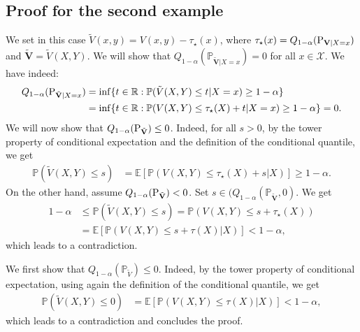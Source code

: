 \subsection{Proof for the second example}
\label{suppl:examplesB}
  We set in this case $\tilde{V}(x,y)= V(x,y) - \tau_\star(x)$, where $\tau_\star(x)= Q_{1-\alpha}(\textup{P}_{\mathbf{V}|X=x})$ and $\tilde{\mathbf{V}}=\tilde{V}(X,Y)$. 
  We will show that $Q_{1-\alpha}(\mathbb{P}_{\tilde{\mathbf{V}}|X=x}) = 0$ for all $x \in \mathcal{X}$. We have indeed:
  \begin{align}
    Q_{1-\alpha}(\textup{P}_{\tilde{\mathbf{V}}|X=x}) &= \inf\{t \in \mathbb{R} : \mathbb{P}(\tilde{V}(X, Y) \leq t | X=x) \geq 1-\alpha\} \\
    &= \inf\{t \in \mathbb{R} : \mathbb{P}(V(X, Y) \leq \tau_\star(X) + t | X=x) \geq 1-\alpha\} = 0.
  \end{align}
  We will now show that $Q_{1-\alpha}(\textup{P}_{\tilde{\mathbf{V}}}) \leq 0$. Indeed, for all $s >0$, by the tower property of conditional expectation and the definition of the conditional quantile, we get
  \begin{align}
    \mathbb{P}(\tilde{V}(X, Y) \leq s) &= \mathbb{E}[\mathbb{P}(V(X, Y) \leq \tau_\star(X) + s | X)] \geq 1-\alpha.
  \end{align}
  On the other hand, assume $Q_{1-\alpha}(\textup{P}_{\tilde{\mathbf{V}}}) < 0$. Set $s \in  ( Q_{1-\alpha}(\mathbb{P}_{\tilde{\mathbf{V}}},0)$. We get 
  \begin{align}
    1-\alpha &\leq  \mathbb{P}(\tilde{V}(X, Y) \leq s) = \mathbb{P}(V(X, Y) \leq s + \tau_\star(X)) \\
    &= \mathbb{E}[\mathbb{P}(V(X, Y) \leq s + \tau(X) | X)]< 1 - \alpha,
  \end{align}
  which leads to a contradiction.

  We first show that $Q_{1-\alpha}(\mathbb{P}_{\tilde{V}}) \leq 0$. Indeed, by the tower property of conditional expectation, using again the definition of the conditional quantile, we get
  \begin{align}
    \mathbb{P}(\tilde{V}(X, Y) \leq 0) &= \mathbb{E}[\mathbb{P}(V(X, Y) \leq \tau(X) | X)] < 1-\alpha,
  \end{align}
  which leads to a contradiction and concludes the proof.
